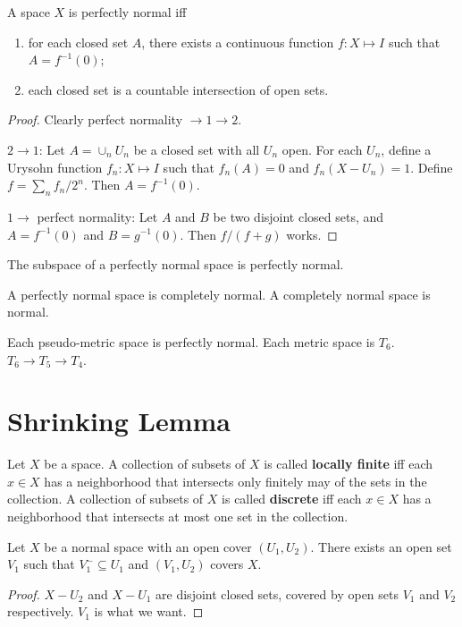 \documentclass[12pt]{book}
\begin{document}
\begin{theorem}
	A space $X$ is perfectly normal iff
	\begin{enumerate}
		\item for each closed set $A$, there exists a continuous function $f:X\mapsto I$ such that $A=f^{-1}(0)$;
		\item each closed set is a countable intersection of open sets.
	\end{enumerate}
\end{theorem}
\begin{proof}
	Clearly perfect normality $\rightarrow1\rightarrow2$.
	
	$2\rightarrow1$: Let $A=\cup_n U_n$ be a closed set with all $U_n$ open. For each $U_n$, define a Urysohn function $f_n:X\mapsto I$ such that $f_n(A)=0$ and $f_n(X-U_n)=1$. Define $f=\sum_nf_n/2^n$. Then $A=f^{-1}(0)$.
	
	$1\rightarrow$ perfect normality: Let $A$ and $B$ be two disjoint closed sets, and $A=f^{-1}(0)$ and $B=g^{-1}(0)$. Then $f/(f+g)$ works.
\end{proof}

\begin{theorem}
	The subspace of a perfectly normal space is perfectly normal. 
\end{theorem}
\begin{corollary}
	A perfectly normal space is completely normal. A completely normal space is normal.
\end{corollary}

\begin{lemma}
	Each pseudo-metric space is perfectly normal. Each metric space is $T_6$. $T_6\rightarrow T_5\rightarrow T_4$.
\end{lemma}

\section{Shrinking Lemma}

\begin{definition}
	Let $X$ be a space. A collection of subsets of $X$ is called {\bf locally finite} iff each $x\in X$ has a neighborhood that intersects only finitely may of the sets in the collection.  A collection of subsets of $X$ is called {\bf discrete} iff each $x\in X$ has a neighborhood that intersects at most one set in the collection.
\end{definition}

\begin{lemma}
	Let $X$ be a normal space with an open cover $(U_1,U_2)$. There exists an open set $V_1$ such that $V_1^-\subseteq U_1$ and $(V_1,U_2)$ covers $X$.
\end{lemma}
\begin{proof}
	$X-U_2$ and $X-U_1$ are disjoint closed sets, covered by open sets $V_1$ and $V_2$ respectively. $V_1$ is what we want.
\end{proof}
\end{document}

